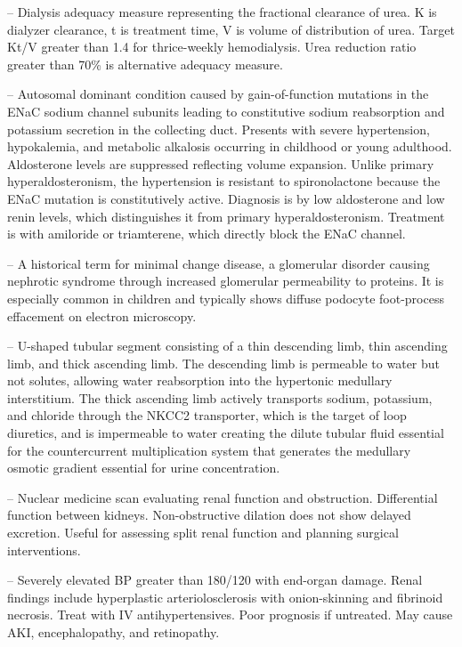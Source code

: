 -- Dialysis adequacy measure representing the fractional clearance of urea. K is dialyzer clearance, t is treatment time, V is volume of distribution of urea. Target Kt/V greater than 1.4 for thrice-weekly hemodialysis. Urea reduction ratio greater than 70\% is alternative adequacy measure.

-- Autosomal dominant condition caused by gain-of-function mutations in the ENaC sodium channel subunits leading to constitutive sodium reabsorption and potassium secretion in the collecting duct. Presents with severe hypertension, hypokalemia, and metabolic alkalosis occurring in childhood or young adulthood. Aldosterone levels are suppressed reflecting volume expansion. Unlike primary hyperaldosteronism, the hypertension is resistant to spironolactone because the ENaC mutation is constitutively active. Diagnosis is by low aldosterone and low renin levels, which distinguishes it from primary hyperaldosteronism. Treatment is with amiloride or triamterene, which directly block the ENaC channel.

-- A historical term for minimal change disease, a glomerular disorder causing nephrotic syndrome through increased glomerular permeability to proteins. It is especially common in children and typically shows diffuse podocyte foot-process effacement on electron microscopy.

-- U-shaped tubular segment consisting of a thin descending limb, thin ascending limb, and thick ascending limb. The descending limb is permeable to water but not solutes, allowing water reabsorption into the hypertonic medullary interstitium. The thick ascending limb actively transports sodium, potassium, and chloride through the NKCC2 transporter, which is the target of loop diuretics, and is impermeable to water creating the dilute tubular fluid essential for the countercurrent multiplication system that generates the medullary osmotic gradient essential for urine concentration.

-- Nuclear medicine scan evaluating renal function and obstruction. Differential function between kidneys. Non-obstructive dilation does not show delayed excretion. Useful for assessing split renal function and planning surgical interventions.

-- Severely elevated BP greater than 180/120 with end-organ damage. Renal findings include hyperplastic arteriolosclerosis with onion-skinning and fibrinoid necrosis. Treat with IV antihypertensives. Poor prognosis if untreated. May cause AKI, encephalopathy, and retinopathy.


